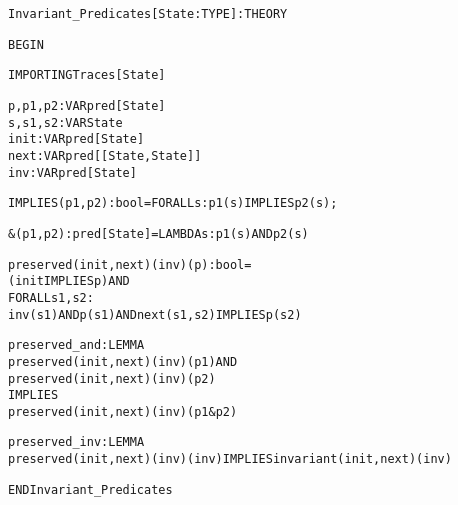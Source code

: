 \newpage
\begin{alltt}
%%%%%%%%%%%%%%%%%%%%%%%%%%%%%%%%%%%%%%%%%%%%
% Invariant_Predicates :                   %
%   Functions used for proving invariants. %
%%%%%%%%%%%%%%%%%%%%%%%%%%%%%%%%%%%%%%%%%%%%

Invariant_Predicates[State : TYPE] : THEORY

BEGIN

  IMPORTING Traces[State]

  p,p1,p2 : VAR pred[State]
  s,s1,s2 : VAR State
  init    : VAR pred[State]
  next    : VAR pred[[State,State]]
  inv     : VAR pred[State]

  IMPLIES(p1,p2):bool = FORALL s: p1(s) IMPLIES p2(s);

  &(p1,p2):pred[State] = LAMBDA s: p1(s) AND p2(s)

  preserved(init,next)(inv)(p):bool =
    (init IMPLIES p) AND
    FORALL s1,s2:
      inv(s1) AND p(s1) AND next(s1,s2) IMPLIES p(s2)   

  preserved_and : LEMMA 
    preserved(init,next)(inv)(p1) AND 
    preserved(init,next)(inv)(p2) 
      IMPLIES 
    preserved(init,next)(inv)(p1 & p2)

  preserved_inv : LEMMA 
    preserved(init,next)(inv)(inv) IMPLIES invariant(init,next)(inv)

END Invariant_Predicates
\end{alltt}


